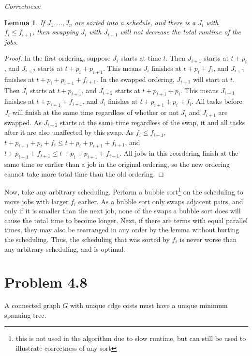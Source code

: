\documentclass{article}
\newtheorem{lemma}[theorem]{Lemma}
\begin{document}
\emph{Correctness: }

\begin{lemma}If $J_1, \dots , J_n$ are sorted into a schedule, and there is a $J_i$ with $f_i \leq f_{i+1}$, then swapping $J_i$ with $J_{i+1}$ will not decrease the total runtime of the jobs.\end{lemma}

\begin{proof}
In the first ordering, suppose $J_i$ starts at time $t$. Then $J_{i+1}$ starts at $t+p_i$, and $J_{i+2}$ starts at $t+p_i+p_{i+1}$. This means $J_i$ finishes at $t+p_i+f_i$, and $J_{i+1}$ finishes at $t+p_i+p_{i+1}+f_{i+1}$.
In the swapped ordering, $J_{i+1}$ will start at $t$. Then $J_{i}$ starts at $t+p_{i+1}$, and $J_{i+2}$ starts at $t+p_{i+1}+p_i$. This means $J_{i+1}$ finishes at $t+p_{i+1}+f_{i+1}$, and $J_i$ finishes at $t+p_{i+1}+p_i+f_{i}$.
All tasks before $J_i$ will finish at the same time regardless of whether or not $J_i$ and $J_{i+1}$ are swapped. As $J_{i+2}$ starts at the same time regardless of the swap, it and all tasks after it are also unaffected by this swap.
As $f_i \leq f_{i+1}$, $t+p_{i+1}+p_i+f_{i} \leq t+p_i+p_{i+1}+f_{i+1}$, and $t+p_{i+1}+f_{i+1} \leq t+p_i+p_{i+1}+f_{i+1}$. All jobs in this reordering finish at the same time or earlier than a job in the original ordering, so the new ordering cannot take more total time than the old ordering.
\end{proof}

Now, take any arbitrary scheduling. Perform a bubble sort\footnote{ this is not used in the algorithm due to slow runtime, but can still be used to illustrate correctness of any sort} on the scheduling to move jobs with larger $f_i$ earlier. As a bubble sort only swaps adjacent pairs, and only if it is smaller than the next job, none of the swaps a bubble sort does will cause the total time to become longer. Next, if there are terms with equal parallel times, they may also be rearranged in any order by the lemma without hurting the scheduling. Thus, the scheduling that was sorted by $f_i$ is never worse than any arbitrary scheduling, and is optimal.

\section{Problem 4.8}

A connected graph $G$ with unique edge costs must have a unique minimum spanning tree.
\end{document}
